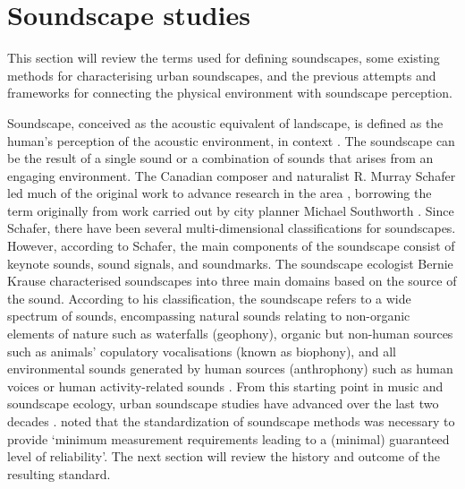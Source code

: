\section{Soundscape studies}
This section will review the terms used for defining soundscapes, some existing methods for characterising urban soundscapes, and the previous attempts and frameworks for connecting the physical environment with soundscape perception.

Soundscape, conceived as the acoustic equivalent of landscape, is defined as the human's perception of the acoustic environment, in context \citep{ISO12913Part1,Kang2010understanding,SoundscapeOursonicSchafer}. The soundscape can be the result of a single sound or a combination of sounds that arises from an engaging environment. The Canadian composer and naturalist R. Murray Schafer led much of the original work to advance research in the area \citep{Schafer1969New}, borrowing the term originally from work carried out by city planner Michael Southworth \citep{Southworth1969sonic}. Since Schafer, there have been several multi-dimensional classifications for soundscapes. However, according to Schafer, the main components of the soundscape consist of keynote sounds, sound signals, and soundmarks. The soundscape ecologist Bernie Krause characterised soundscapes into three main domains based on the source of the sound. According to his classification, the soundscape refers to a wide spectrum of sounds, encompassing natural sounds relating to non-organic elements of nature such as waterfalls (geophony), organic but non-human sources such as animals' copulatory vocalisations (known as biophony), and all environmental sounds generated by human sources (anthrophony) such as human voices or human activity-related sounds \citep{Krause1987WholeEarth,Kang2016}. From this starting point in music and soundscape ecology, urban soundscape studies have advanced over the last two decades \citep{Kang2006Urban,Kang2018Impact}. \citet{Fiebig2018Does} noted that the standardization of soundscape methods was necessary to provide `minimum measurement requirements leading to a (minimal) guaranteed level of reliability'. The next section will review the history and outcome of the resulting standard.

